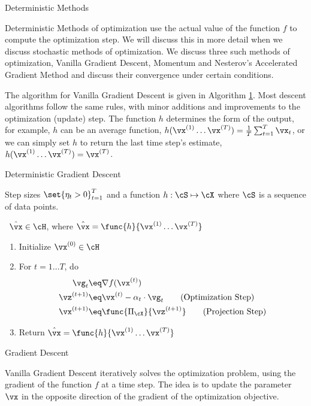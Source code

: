 \documentclass{article}
\newcommand{\gf}[1]{\nabla f(\vx^{(#1)})}
\newcommand{\x}[1]{\vx^{(#1)}}
\newcommand{\z}[1]{\vz^{(#1)}}
\begin{document}
\begin{psection}{Deterministic Methods}

	Deterministic Methods of optimization use the actual value of the function $f$ to compute the optimization step. We will discuss this in more detail when we discuss stochastic methods of optimization. We discuss three such methods of optimization, Vanilla Gradient Descent, Momentum and Nesterov's Accelerated Gradient Method and discuss their convergence under certain conditions.

	The algorithm for Vanilla Gradient Descent is given in Algorithm \hyperlink{algo:1}{1}. Most descent algorithms follow the same rules, with minor additions and improvements to the optimization (update) step. The function $h$ determines the form of the output, for example, $h$ can be an average function, \ie $h(\x{1} \dots \x{T}) = \frac{1}{T} \sum_{t = 1}^T \vx_t$, or we can simply set $h$ to return the last time step's estimate, \ie $h(\x{1} \dots \x{T}) = \x{T}$.

	\begin{algo}[0.9\textwidth]{Deterministic Gradient Descent}

		 \quad Step sizes $\set{\eta_t > 0}_{t = 1}^T$ and a function $h : \cS \mapsto \cX $ where $\cS$ is a sequence of data points. \sbr

		\, $\hat{\vx} \in \cH$, where $\hat{\vx} = \func{h}{\vx^{(1)} \dots \vx^{(T)}}$ \sbr


		\begin{enumerate}
			\item Initialize $\x{0} \in \cH$
			\item For $t = 1 \dots T$, do
				\begin{align}
					\vg_t		&\eq	\gf{t}							\nonumber				\\
					\z{t + 1}	&\eq	\x{t} - \alpha_t \cdot \vg_t	\tag{Optimization Step}	\\
					\x{t + 1}	&\eq	\func{\Pi_{\cX}}{\z{t + 1}}		\tag{Projection Step}
				\end{align}
			\item Return $\hat{\vx} = \func{h}{\x{1} \dots \x{T}}$
		\end{enumerate}

	\end{algo}

	\begin{psubsection}{Gradient Descent}

		Vanilla Gradient Descent iteratively solves the optimization problem, using the gradient of the function $f$ at a time step. The idea is to update the parameter $\vx$ in the opposite direction of the gradient of the optimization objective.


\end{psubsection}
\end{psection}
\end{document}
